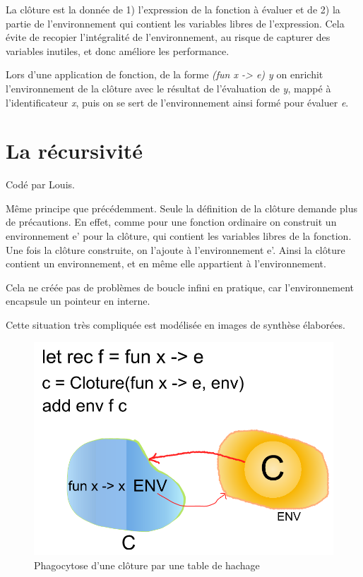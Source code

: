 \documentclass[a4paper,10pt]{report}
\begin{document}
La clôture est la donnée de 1) l'expression de la fonction à évaluer et de 2) la partie de l'environnement qui contient les variables libres de l'expression. Cela évite de recopier l'intégralité de l'environnement, au risque de capturer des variables inutiles, et donc améliore les performance.  
  
Lors d'une application de fonction, de la forme \textit{(fun x -> e) y} on enrichit l'environnement de la clôture avec le résultat de l'évaluation de \textit{y}, mappé à l'identificateur \textit{x}, puis on se sert de l'environnement ainsi formé pour évaluer \textit{e}.  
  
\section{La récursivité}  
Codé par Louis.

Même principe que précédemment. Seule la définition de la clôture demande plus de précautions.  
En effet, comme pour une fonction ordinaire on construit un environnement e' pour la clôture, qui contient les variables libres de la fonction. Une fois la clôture construite, on l'ajoute à l'environnement e'. Ainsi la clôture contient un environnement, et en même elle appartient à l'environnement.   
  
Cela ne créée pas de problèmes de boucle infini en pratique, car l'environnement encapsule un pointeur en interne.  
  
Cette situation très compliquée est modélisée en images de synthèse élaborées.  
  
\begin{figure}
\center
\includegraphics[scale=0.3]{Drawing.png} 
\caption {Phagocytose d'une clôture par une table de hachage}
\end{figure}
\end{document}
